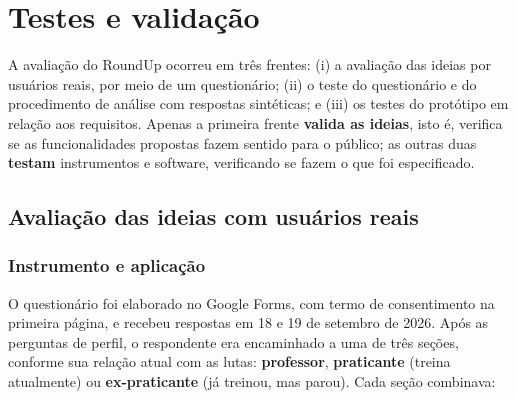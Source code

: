 %

\chapter{Testes e validação}
\label{cap:testes}

A avaliação do RoundUp ocorreu em três frentes: (i) a avaliação das
ideias por usuários reais, por meio de um questionário; (ii) o teste do
questionário e do procedimento de análise com respostas sintéticas; e
(iii) os testes do protótipo em relação aos requisitos. Apenas a primeira
frente \textbf{valida as ideias}, isto é, verifica se as funcionalidades
propostas fazem sentido para o público; as outras duas \textbf{testam}
instrumentos e software, verificando se fazem o que foi especificado.

\section{Avaliação das ideias com usuários reais}
\label{sec:val-survey}

\subsection{Instrumento e aplicação}

O questionário foi elaborado no Google Forms, com termo de consentimento
na primeira página, e recebeu respostas em 18 e 19 de setembro de 2026.
Após as perguntas de perfil, o respondente era encaminhado a uma de três
seções, conforme sua relação atual com as lutas: \textbf{professor},
\textbf{praticante} (treina atualmente) ou \textbf{ex-praticante} (já
treinou, mas parou). Cada seção combinava:

